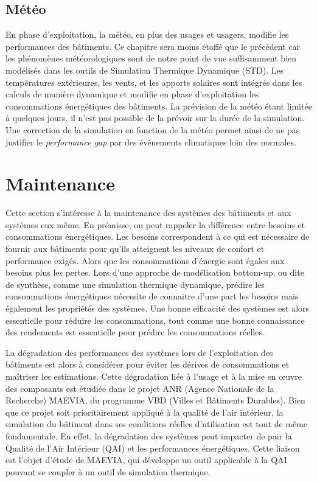 \subsection{Météo}

En phase d'exploitation, la météo, en plus des usages et usagers, modifie les performances des bâtiments. Ce chapitre sera moins étoffé que le précédent car les phénomènes météorologiques sont de notre point de vue suffisamment bien modélisés dans les outils de Simulation Thermique Dynamique (STD). Les températures extérieures, les vents, et les apports solaires sont intégrés dans les calculs de manière dynamique et modifie en phase d'exploitation les consommations énergétiques des bâtiments. La prévision de la météo étant limitée à quelques jours, il n'est pas possible de la prévoir sur la durée de la simulation. Une correction de la simulation en fonction de la météo permet ainsi de ne pas justifier le \textit{performance gap} par des événements climatiques loin des normales.

\section{Maintenance}

Cette section s'intéresse à la maintenance des systèmes des bâtiments et aux systèmes eux même. En prémisse, on peut rappeler la différence entre besoins et consommations énergétiques. Les besoins correspondent à ce qui est nécessaire de fournir aux bâtiments pour qu'ils atteignent les niveaux de confort et performance exigés. Alors que les consommations d'énergie sont égales aux besoins plus les pertes. Lors d'une approche de modélisation bottom-up, ou dite de synthèse, comme une simulation thermique dynamique, prédire les consommations énergétiques nécessite de connaitre d'une part les besoins mais également les propriétés des systèmes. Une bonne efficacité des systèmes est alors essentielle pour réduire les consommations, tout comme une bonne connaissance des rendements est essentielle pour prédire les consommations réelles.

La dégradation des performances des systèmes lors de l'exploitation des bâtiments est alors à considérer pour éviter les dérives de consommations et maîtriser les estimations. Cette dégradation liée à l'usage et à la mise en œuvre des composants est étudiée dans le projet ANR (Agence Nationale de la Recherche) MAEVIA, du programme VBD (Villes et Bâtiments Durables). Bien que ce projet soit prioritairement appliqué à la qualité de l'air intérieur, la simulation du bâtiment dans ses conditions réelles d'utilisation est tout de même fondamentale. En effet, la dégradation des systèmes peut impacter de pair la Qualité de l'Air Intérieur (QAI) et les performances énergétiques. Cette liaison est l'objet d'étude de MAEVIA, qui développe un outil applicable à la QAI pouvant se coupler à un outil de simulation thermique.

